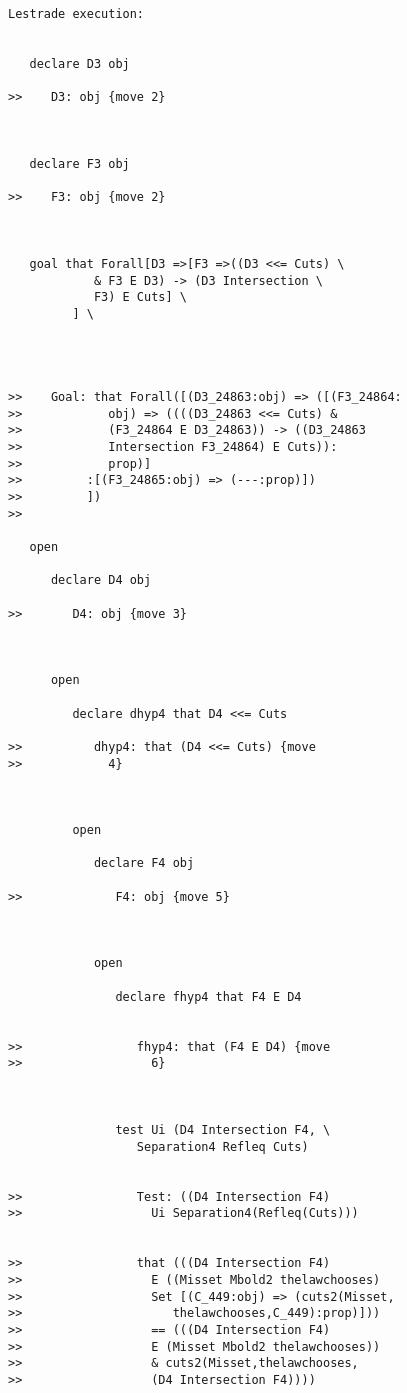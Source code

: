 \documentclass[12pt]{article}
\begin{document}
\begin{verbatim}Lestrade execution:


   declare D3 obj

>>    D3: obj {move 2}



   declare F3 obj

>>    F3: obj {move 2}



   goal that Forall[D3 =>[F3 =>((D3 <<= Cuts) \
            & F3 E D3) -> (D3 Intersection \
            F3) E Cuts] \
         ] \
      



>>    Goal: that Forall([(D3_24863:obj) => ([(F3_24864:
>>            obj) => ((((D3_24863 <<= Cuts) &
>>            (F3_24864 E D3_24863)) -> ((D3_24863
>>            Intersection F3_24864) E Cuts)):
>>            prop)]
>>         :[(F3_24865:obj) => (---:prop)])
>>         ])
>>      

   open

      declare D4 obj

>>       D4: obj {move 3}



      open

         declare dhyp4 that D4 <<= Cuts

>>          dhyp4: that (D4 <<= Cuts) {move
>>            4}



         open

            declare F4 obj

>>             F4: obj {move 5}



            open

               declare fhyp4 that F4 E D4


>>                fhyp4: that (F4 E D4) {move
>>                  6}



               test Ui (D4 Intersection F4, \
                  Separation4 Refleq Cuts)


>>                Test: ((D4 Intersection F4)
>>                  Ui Separation4(Refleq(Cuts)))


>>                that (((D4 Intersection F4)
>>                  E ((Misset Mbold2 thelawchooses)
>>                  Set [(C_449:obj) => (cuts2(Misset,
>>                     thelawchooses,C_449):prop)]))
>>                  == (((D4 Intersection F4)
>>                  E (Misset Mbold2 thelawchooses))
>>                  & cuts2(Misset,thelawchooses,
>>                  (D4 Intersection F4))))




\end{verbatim}
\end{document}

